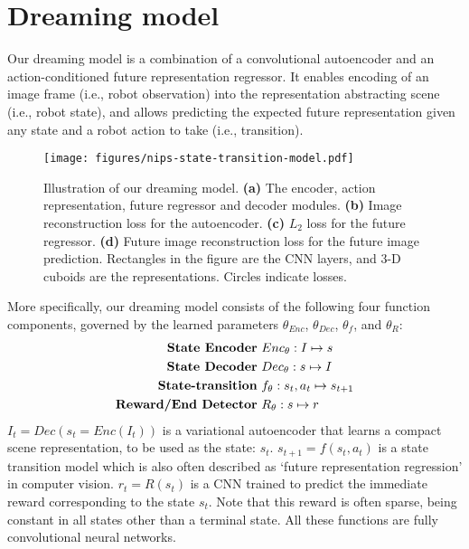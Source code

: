 \documentclass[letterpaper, 10 pt, conference]{ieeeconf}
\begin{document}
\section{Dreaming model}

Our dreaming model is a combination of a convolutional autoencoder and an action-conditioned future representation regressor. It enables encoding of an image frame (i.e., robot observation) into the representation abstracting scene (i.e., robot state), and allows predicting the expected future representation given any state and a robot action to take (i.e., transition).


\begin{figure*}
    \centering
      \texttt{[image: figures/nips-state-transition-model.pdf]}
      \caption{Illustration of our dreaming model. \textbf{(a)} The encoder, action representation, future regressor and decoder modules. \textbf{(b)} Image reconstruction loss for the autoencoder. \textbf{(c)} $L_2$ loss for the future regressor. \textbf{(d)} Future image reconstruction loss for the future image prediction. Rectangles in the figure are the CNN layers, and 3-D cuboids are the representations. Circles indicate losses.}
      \label{fig:dream-model}
\end{figure*}




More specifically, our dreaming model consists of the following four function components, governed by the learned parameters $\theta_{Enc}$, $\theta_{Dec}$, $\theta_f$, and $\theta_R$:
\begin{align*}
\mbox{\textbf{State Encoder} } & Enc_{\theta}: I \mapsto s
\\
\mbox{\textbf{State Decoder} } & Dec_{\theta}: s \mapsto I
\\
\mbox{\textbf{State-transition} } & f_{\theta}: s_t,a_t \mapsto s_{t+1}
\\
\mbox{\textbf{Reward/End Detector} } & R_{\theta}: s \mapsto r
\end{align*}
$I_t = Dec(s_t = Enc(I_t))$ is a variational autoencoder that learns a compact scene representation, to be used as the state: $s_t$.
$s_{t+1} = f(s_t, a_t)$ is a state transition model which is also often described as `future representation regression' in computer vision.
$r_t = R(s_t)$ is a CNN trained to predict the immediate reward corresponding to the state $s_t$. Note that this reward is often sparse, being constant in all states other than a terminal state.
All these functions are fully convolutional neural networks.
\end{document}
